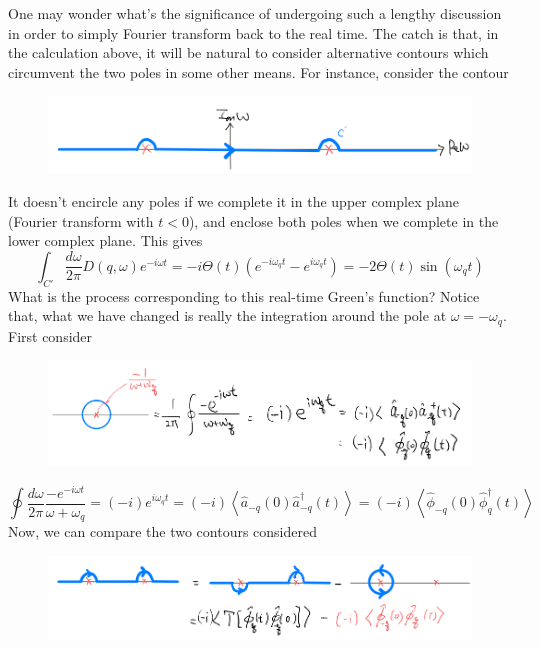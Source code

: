 One may wonder what's the significance of undergoing such a lengthy discussion in order to simply Fourier transform back to the real time. The catch is that, in the calculation above, it will be natural to consider alternative contours which circumvent the two poles in some other means. For instance, consider the contour
\begin{figure}[ht]
    \centering
    \includegraphics[width=\textwidth]{jupyterbook/data/fig/lec12-fig05.png}
\end{figure}
It doesn't encircle any poles if we complete it in the upper complex plane (Fourier transform with $t<0$), and enclose both poles when we complete in the lower complex plane. This gives
\[ \int_{C'}{\frac{d\omega}{2\pi}D\left( q,\omega \right) e^{-i\omega t}}=-i\Theta \left( t \right) \left( e^{-i\omega _qt}-e^{i\omega _qt} \right) =-2\Theta \left( t \right) \sin \left( \omega _qt \right)\]
What is the process corresponding to this real-time Green's function? Notice that, what we have changed is really the integration around the pole at $\omega=-\omega_q$. First consider
\begin{figure}[ht]
    \centering
    \includegraphics[width=\textwidth]{jupyterbook/data/fig/lec12-fig06.png}
\end{figure}
\[ \oint{\frac{d\omega}{2\pi}\frac{-e^{-i\omega t}}{\omega +\omega _q}}=\left( -i \right) e^{i\omega _qt}=\left( -i \right) \left< \hat{a}_{-q}\left( 0 \right) \hat{a}_{-q}^{\dagger}\left( t \right) \right> =\left( -i \right) \left< \hat{\phi}_{-q}\left( 0 \right) \hat{\phi}_{q}^{\dagger}\left( t \right) \right> \]
Now, we can compare the two contours considered
\begin{figure}[ht]
    \centering
    \includegraphics[width=\textwidth]{jupyterbook/data/fig/lec12-fig07.png}
\end{figure}

